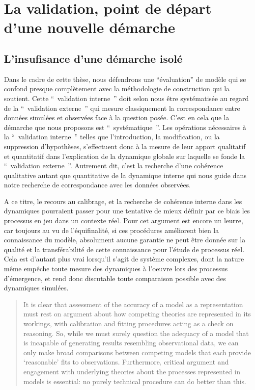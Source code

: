 {\section{La validation, point de départ d'une nouvelle démarche}

\subsection{L'insufisance d'une démarche isolé}

Dans le cadre de cette thèse, nous défendrons une \enquote{évaluation} de modèle qui se confond presque complètement avec la méthodologie de construction qui la soutient. Cette \enquote{ validation interne } doit selon nous être systématisée au regard de la \enquote{ validation externe } qui mesure classiquement la correspondance entre données simulées et observées face à la question posée. C’est en cela que la démarche que nous proposons est \enquote{ systématique }. Les opérations nécessaires à la \enquote{ validation interne } telles que l'introduction, la modification, ou la suppression d'hypothèses, s’effectuent donc à la mesure de leur apport qualitatif et quantitatif dans l'explication de la dynamique globale sur laquelle se fonde la \enquote{ validation externe }. Autrement dit, c'est la recherche d'une cohérence qualitative autant que quantitative de la dynamique interne qui nous guide dans notre recherche de correspondance avec les données observées.

A ce titre, le recours au calibrage, et la recherche de cohérence interne dans les dynamiques pourraient passer pour une tentative de mieux définir par ce biais les processus en jeu dans un contexte réel. Pour \autocite{OSullivan2004} cet argument est encore un leurre, car toujours au vu de l'équifinalité, si ces procédures améliorent bien la connaissance du modèle, absolument aucune garantie ne peut être donnée sur la qualité et la transférabilité de cette connaissance pour l'étude de processus réel. Cela est d'autant plus vrai lorsqu'il s'agit de système complexes, dont la nature même empêche toute  mesure des dynamiques à l'oeuvre lors des processus d'émergence, et rend donc discutable toute comparaison possible avec des dynamiques simulées. 

\begin{quotation} It is clear that assessment of the accuracy of a model as a representation must rest on argument about how competing theories are represented in its workings, with calibration and fitting procedures acting as a check on reasoning. So, while we must surely question the adequacy of a model that is incapable of generating results resembling observational data, we can only make broad comparisons between competing models that each provide ‘reasonable’ fits to observations. Furthermore, critical argument and engagement with underlying theories about the processes represented in models is essential: no purely technical procedure can do better than this.  \\  \end{quotation}

}
